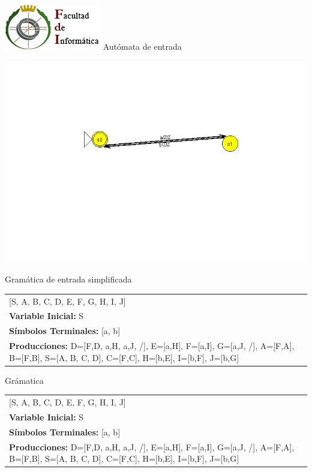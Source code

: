\documentclass[a4paper,11pt]{article}
\newcommand{\MYp}[1]{ {\color[rgb]{0.392,0.392,0.392}#1} }
\begin{document}
\includegraphics{fdi.jpg}
\newline
\newline
\newline
\MYp{\Huge Aut\'{o}mata de entrada}
\begin{center}
\includegraphics[width=\textwidth]{imagenEntrada.jpg}
\end{center}
\MYp{\Huge Gram\'{a}tica de entrada simplificada\newline
\newline
}
\begin{center}\begin{tabular}{ m{15cm} }

\noindent {\bf Variables: }[S, A, B, C, D, E, F, G, H, I, J] \\
{\bf Variable Inicial: }S \\ 
{\bf S\'{i}mbolos Terminales: }[a, b] \\ 
{\bf Producciones: }{D=[F,D, a,H, a,J, /], E=[a,H], F=[a,I], G=[a,J, /], A=[F,A], B=[F,B], S=[A, B, C, D], C=[F,C], H=[b,E], I=[b,F], J=[b,G]} \\ 
\end{tabular}
\end{center}
\newpage\MYp{\Huge Gr\'amatica}
\newline

\begin{center}\begin{tabular}{ m{15cm} }

\noindent {\bf Variables: }[S, A, B, C, D, E, F, G, H, I, J] \\
{\bf Variable Inicial: }S \\ 
{\bf S\'{i}mbolos Terminales: }[a, b] \\ 
{\bf Producciones: }{D=[F,D, a,H, a,J, /], E=[a,H], F=[a,I], G=[a,J, /], A=[F,A], B=[F,B], S=[A, B, C, D], C=[F,C], H=[b,E], I=[b,F], J=[b,G]} \\ 
\end{tabular}
\end{center}
\end{document}
